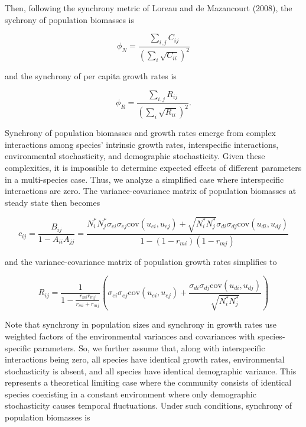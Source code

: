 \documentclass[12pt,]{article}
\begin{document}
\noindent Then, following the synchrony metric of Loreau and {{de
Mazancourt}} (2008), the sychrony of population biomasses is

\begin{equation}
\phi_N = \frac{\sum_{i,j}C_{ij}}{\left( \sum_i \sqrt{C_{ii}} \right)^2}
\end{equation}

\noindent and the synchrony of per capita growth rates is

\begin{equation}
\phi_R = \frac{\sum_{i,j}R_{ij}}{\left( \sum_i \sqrt{R_{ii}} \right)^2}.
\end{equation}

Synchrony of population biomasses and growth rates emerge from complex
interactions among species' intrinsic growth rates, interspecific
interactions, environmental stochasticity, and demographic
stochasticity. Given these complexities, it is impossible to determine
expected effects of different parameters in a multi-species case. Thus,
we analyze a simplified case where interspecific interactions are zero.
The variance-covariance matrix of population biomasses at steady state
then becomes

\begin{equation}
c_{ij} = \frac{B_{ij}}{1-A_{ii} A_{jj}} = \frac{N_{i}^* N_{j}^* \sigma_{ei} \sigma_{ej} \text{cov}(u_{ei},u_{ej}) + \sqrt{N_{i}^* N_{j}^*} \sigma_{di}\sigma_{dj} \text{cov}(u_{di},u_{dj})}{1 - (1-r_{mi})(1-r_{mj})}
\end{equation}

and the variance-covariance matrix of population growth rates simplifies
to

\begin{equation}
R_{ij} = \frac{1}{1- \frac{r_{mi}r_{mj}}{r_{mi}+r_{mj}}} \left( \sigma_{ei} \sigma_{ej} \text{cov}(u_{ei},u_{ej}) + \frac{\sigma_{di}\sigma_{dj} \text{cov}(u_{di},u_{dj})}{\sqrt{N_{i}^* N_{j}^*}} \right)
\end{equation}

\noindent Note that synchrony in population sizes and synchrony in
growth rates use weighted factors of the environmental variances and
covariances with species-specific parameters. So, we further assume
that, along with interspecific interactions being zero, all species have
identical growth rates, environmental stochasticity is absent, and all
species have identical demographic variance. This represents a
theoretical limiting case where the community consists of identical
species coexisting in a constant environment where only demographic
stochasticity causes temporal fluctuations. Under such conditions,
synchrony of population biomasses is
\end{document}
